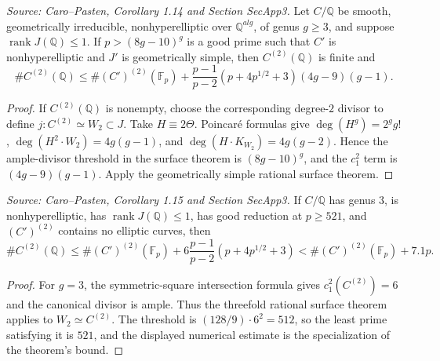 \begin{corollary}
  \label{cor:cp_quadratic_points}
  \textit{Source: Caro--Pasten, Corollary 1.14 and Section SecApp3.}
  Let \(C/\mathbb Q\) be smooth, geometrically irreducible, nonhyperelliptic
  over \(\mathbb Q^{alg}\), of genus \(g\ge3\), and suppose
  \(\operatorname{rank}J(\mathbb Q)\le1\).  If
  \(p>(8g-10)^g\) is a good prime such that \(C'\) is nonhyperelliptic and
  \(J'\) is geometrically simple, then \(C^{(2)}(\mathbb Q)\) is finite and
  \[
    \#C^{(2)}(\mathbb Q)\le \#(C')^{(2)}(\mathbb F_p)
      +\frac{p-1}{p-2}(p+4p^{1/2}+3)(4g-9)(g-1).
  \]
\end{corollary}
\begin{proof}
  If \(C^{(2)}(\mathbb Q)\) is nonempty, choose the corresponding degree-\(2\)
  divisor to define \(j:C^{(2)}\simeq W_2\subset J\).  Take
  \(H\equiv2\Theta\).  Poincaré formulas give
  \(\deg(H^g)=2^g g!\), \(\deg(H^2\cdot W_2)=4g(g-1)\), and
  \(\deg(H\cdot K_{W_2})=4g(g-2)\).  Hence the ample-divisor threshold in the
  surface theorem is \((8g-10)^g\), and the \(c_1^2\) term is
  \((4g-9)(g-1)\).  Apply the geometrically simple rational surface theorem.
\end{proof}

\begin{corollary}
  \label{cor:cp_quadratic_points_genus_three}
  \textit{Source: Caro--Pasten, Corollary 1.15 and Section SecApp3.}
  If \(C/\mathbb Q\) has genus \(3\), is nonhyperelliptic, has
  \(\operatorname{rank}J(\mathbb Q)\le1\), has good reduction at
  \(p\ge521\), and \((C')^{(2)}\) contains no elliptic curves, then
  \[
    \#C^{(2)}(\mathbb Q)\le \#(C')^{(2)}(\mathbb F_p)
      +6\frac{p-1}{p-2}(p+4p^{1/2}+3)
      <\#(C')^{(2)}(\mathbb F_p)+7.1p .
  \]
\end{corollary}
\begin{proof}
  For \(g=3\), the symmetric-square intersection formula gives
  \(c_1^2(C^{(2)})=6\) and the canonical divisor is ample.  Thus the
  threefold rational surface theorem applies to \(W_2\simeq C^{(2)}\).  The
  threshold is \((128/9)\cdot6^2=512\), so the least prime satisfying it is
  \(521\), and the displayed numerical estimate is the specialization of the
  theorem's bound.
\end{proof}
